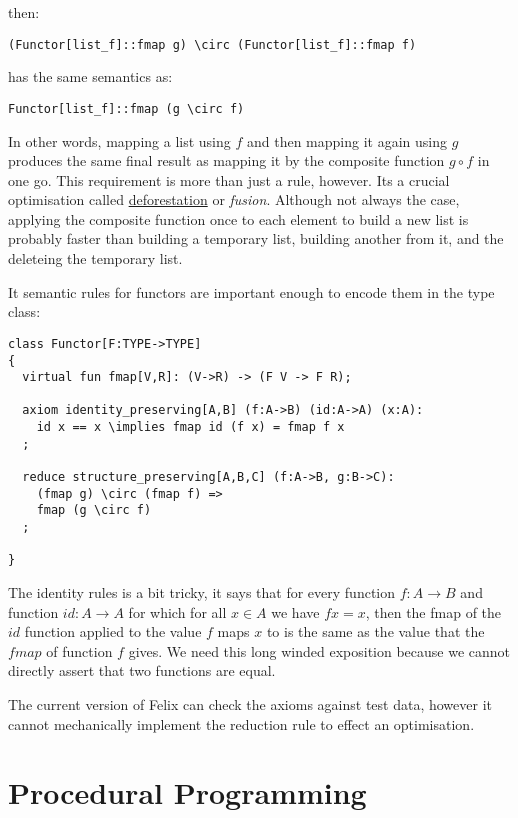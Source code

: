 \documentclass[oneside]{book}
\begin{document}
then:

\begin{verbatim}
(Functor[list_f]::fmap g) \circ (Functor[list_f]::fmap f)
\end{verbatim}

has the same semantics as:

\begin{verbatim}
Functor[list_f]::fmap (g \circ f)
\end{verbatim}

In other words, mapping a list using $f$ and then mapping it
again using $g$ produces the same final result as mapping
it by the composite function $g \circ f$ in one go. This requirement
is more than just a rule, however. Its a crucial optimisation
called \href{https://en.wikipedia.org/wiki/Deforestation_%28computer_science%29}{deforestation} 
or {\em fusion}. Although not always the case, applying the composite function
once to each element to build a new list is probably faster than
building a temporary list, building another from it, and the deleteing
the temporary list.

It semantic rules for functors are important enough to encode
them in the type class:

\begin{verbatim}
class Functor[F:TYPE->TYPE]
{
  virtual fun fmap[V,R]: (V->R) -> (F V -> F R);

  axiom identity_preserving[A,B] (f:A->B) (id:A->A) (x:A):
    id x == x \implies fmap id (f x) = fmap f x
  ;

  reduce structure_preserving[A,B,C] (f:A->B, g:B->C):
    (fmap g) \circ (fmap f) =>
    fmap (g \circ f)
  ;

}
\end{verbatim}

The identity rules is a bit tricky, it says that for every
function $f: A \rightarrow B$ and function $id: A\rightarrow A$
for which for all $x \in A$ we have $f x = x$, then the fmap
of the $id$ function applied to the value $f$ maps $x$ to
is the same as the value that the $fmap$ of function $f$ gives.
We need this long winded exposition because we cannot directly
assert that two functions are equal.

The current version of Felix can check the axioms against test data,
however it cannot mechanically implement the reduction rule to
effect an optimisation.

\part{Procedural Programming}
\end{document}

